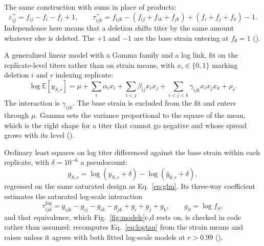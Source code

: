  The same construction with sums in place of products:
%
\begin{equation}
\varepsilon^{+}_{ij} = f_{ij} - f_i - f_j + 1 ,
\qquad
\tau^{+}_{ijk} = f_{ijk} - (f_{ij} + f_{ik} + f_{jk}) + (f_i + f_j + f_k) - 1 .
\label{eq:add}
\end{equation}
%
Independence here means that a deletion shifts titer by the same amount whatever else is
deleted. The $+1$ and $-1$ are the base strain entering at $f_\emptyset = 1$
().

 A generalized linear model with a Gamma family and a log link, fit
on the replicate-level titers rather than on strain means, with $x_i \in \{0,1\}$ marking
deletion $i$ and $r$ indexing replicate:
%
\begin{equation}
\log \mathbb{E}[y_{S,r}] = \mu + \sum_i \alpha_i x_i + \sum_{i<j} \beta_{ij} x_i x_j
+ \sum_{i<j<k} \gamma_{ijk} x_i x_j x_k + \rho_r .
\label{eq:glm}
\end{equation}
%
The interaction is $\gamma_{ijk}$. The base strain is excluded from the fit and enters
through $\mu$. Gamma sets the variance proportional to the square of the mean, which is the
right shape for a titer that cannot go negative and whose spread grows with its level
().

 Ordinary least squares on log titer differenced against the base strain
within each replicate, with $\delta = 10^{-6}$ a pseudocount:
%
\begin{equation}
g_{S,r} = \log(y_{S,r} + \delta) - \log(\bar{y}_{\emptyset,r} + \delta) ,
\label{eq:logols}
\end{equation}
%
regressed on the same saturated design as Eq.~\ref{eq:glm}. Its three-way coefficient
estimates the saturated log-scale interaction
%
\begin{equation}
\tau^{\log}_{ijk} = g_{ijk} - g_{ij} - g_{ik} - g_{jk} + g_i + g_j + g_k ,
\qquad g_S = \log f_S ,
\label{eq:logtau}
\end{equation}
%
and that equivalence, which Fig.~\ref{fig:models}c,d rests on, is checked in code rather
than assumed:  recomputes Eq.~\ref{eq:logtau} from
the strain means and raises unless it agrees with both fitted log-scale models at
$r > 0.99$ ().

